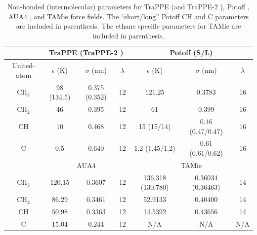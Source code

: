\documentclass[journal=jctc,manuscript=article]{achemso}
\begin{document}
\begin{table}[h!]
	\caption{Non-bonded (intermolecular) parameters for TraPPE \cite{TraPPE,Martin1999} (and TraPPE-2 \cite{TraPPEUA2}), Potoff \cite{Mie,Potoff_branched}, AUA4 \cite{AUA4,Nieto2008}, and TAMie \cite{TAMie,Weidler2016} force fields. The ``short/long'' Potoff CH and C parameters are included in parenthesis. The ethane specific parameters for TAMie are included in parenthesis.} \label{tab:nonbonded params}
	\begin{center}
		\begin{tabular}{|c|c|c|c|c|c|c|}
			\hline
			\multicolumn{1}{|c}{} & \multicolumn{3}{|c}{TraPPE  (TraPPE-2 )} & \multicolumn{3}{|c|}{Potoff (S/L)}  \\ \hline
			United-atom & $\epsilon$ (K) & $\sigma$ (nm) & $\lambda$ & $\epsilon$ (K) & $\sigma$ (nm) & $\lambda$ \\ \hline
			CH$_3$ & 98 (134.5)  & 0.375 (0.352) & 12 & 121.25 & 0.3783 & 16  \\ 
			CH$_2$ & 46 & 0.395 & 12 & 61 & 0.399 & 16 \\ 
			CH & 10 & 0.468 & 12 & 15 (15/14) & 0.46 (0.47/0.47) & 16\\
			C & 0.5 & 0.640 & 12 & 1.2 (1.45/1.2) & 0.61 (0.61/0.62) & 16\\
			\hline
			\multicolumn{1}{|c}{} & \multicolumn{3}{|c}{AUA4} & \multicolumn{3}{|c|}{TAMie} \\ \hline
			CH$_3$ & 120.15  & 0.3607 & 12 & 136.318 (130.780) & 0.36034 (0.36463) & 14 \\ 
			CH$_2$ & 86.29 & 0.3461 & 12 & 52.9133 & 0.40400 & 14 \\ 
			CH & 50.98 & 0.3363 & 12 & 14.5392 & 0.43656 & 14\\
			C & 15.04 & 0.244 & 12 & N/A & N/A & N/A\\
			\hline
		\end{tabular}
	\end{center} 
\end{table}
\end{document}

